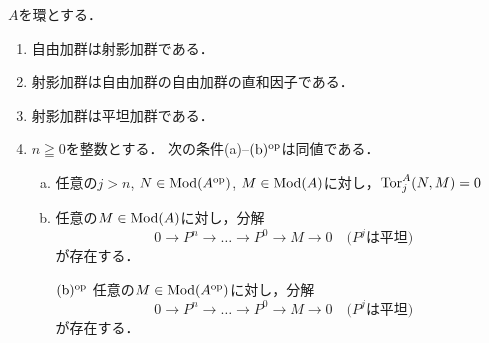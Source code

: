 \begin{PRP}
    \(A\)を環とする．
    \begin{enumerate}
        \item 自由加群は射影加群である．
        
        \item 射影加群は自由加群の自由加群の直和因子である．
        
        \item 射影加群は平坦加群である．
        
        \item \(n\geqq0\)を整数とする．
            次の条件(a)--\((\text{b})^{{\rm op}}\)は同値である．
            \begin{enumerate}[(a)]
                \item 任意の\(j>n\), \(N\in\mathop{\mathrm{Mod}}\nolimits(A^{\rm op})\), 
                \(M\in\mathop{\mathrm{Mod}}\nolimits(A)\)に対し，\(\mathop{\mathrm{Tor}}\nolimits_j^A(N,M)=0\)
                \item 任意の\(M\in\mathop{\mathrm{Mod}}\nolimits(A)\)に対し，分解\[
                    0\to P^n\to\dots\to P^0\to M\to0\quad\text{(\(P^j\)は平坦)}
                    \]が存在する．
                \item[\((\text{b})^{{\rm op}}\)]\setlength{\leftskip}{10pt}
                任意の\(M\in\mathop{\mathrm{Mod}}\nolimits(A^{\rm op})\)に対し，分解\[
                    0\to P^n\to\dots\to P^0\to M\to0\quad\text{(\(P^j\)は平坦)}
                \]が存在する．
            \end{enumerate}
    \end{enumerate}
\end{PRP}
